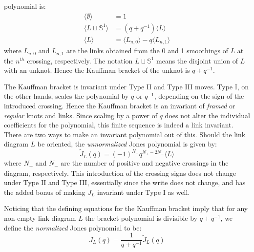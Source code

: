         polynomial is:
        \begin{align}
            \label{eqn:kauffman_bracket}
            \langle\emptyset\rangle&=1\\
            \langle{L\sqcup\mathbb{S}^{1}}\rangle&=(q+q^{-1})\langle{L}\rangle\\
            \langle{L}\rangle&=
                \langle{L_{n,0}}\rangle-q\langle{L_{n,1}}\rangle
        \end{align}
        where $L_{n,0}$ and $L_{n,1}$ are the links obtained from the
        0 and 1 smoothings of $L$ at the $n^{th}$ crossing, respectively. The
        notation $L\sqcup\mathbb{S}^{1}$ means the disjoint union of
        $L$ with an unknot. Hence the Kauffman bracket of the
        unknot is $q+q^{-1}$.
        \par\hfill\par
        The Kauffman bracket is invariant under Type II and Type III moves.
        Type I, on the other hands, scales the polynomial by $q$ or $q^{-1}$,
        depending on the sign of the introduced crossing. Hence the Kauffman
        bracket is an invariant of \textit{framed} or \textit{regular} knots
        and links. Since scaling by a power of $q$ does not alter the individual
        coefficients for the polynomial, this finite sequence is indeed a link
        invariant. There are two ways to make an invariant polynomial out of
        this. Should the link diagram $L$ be oriented, the
        \textit{unnormalized} Jones polynomial is given by:
        \begin{equation}
            \label{eqn:unnormalized_jones}
            \tilde{J}_{L}(q)=(-1)^{N_{-}}q^{N_{+}-2N_{-}}\langle{L}\rangle
        \end{equation}
        where $N_{+}$ and $N_{-}$ are the number of positive and negative
        crossings in the diagram, respectively. This introduction of the
        crossing signs does not change under Type II and Type III, essentially
        since the write does not change, and has the added bonus of making
        $J_{L}$ invariant under Type I as well.
        \par\hfill\par
        Noticing that the defining
        equations for the Kauffman bracket imply that for any non-empty link
        diagram $L$ the bracket polynomial is divisible by $q+q^{-1}$, we
        define the \textit{normalized} Jones polynomial to be:
        \begin{equation}
            J_{L}(q)=\frac{1}{q+q^{-1}}\tilde{J}_{L}(q)
        \end{equation}
